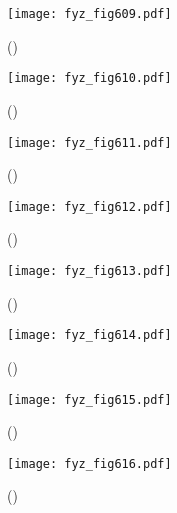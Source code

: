     \begin{figure}[ht!] %
      \centering
      \texttt{[image: fyz\_fig609.pdf]}
      \caption{
               (\cite[s.~707]{Feynman02})}
      \label{fyz:fig609}
    \end{figure}

    \begin{figure}[ht!] %
      \centering
      \texttt{[image: fyz\_fig610.pdf]}
      \caption{
               (\cite[s.~707]{Feynman02})}
      \label{fyz:fig610}
    \end{figure}

    \begin{figure}[ht!] %
      \centering
      \texttt{[image: fyz\_fig611.pdf]}
      \caption{
               (\cite[s.~707]{Feynman02})}
      \label{fyz:fig611}
    \end{figure}

    \begin{figure}[ht!] %
      \centering
      \texttt{[image: fyz\_fig612.pdf]}
      \caption{
               (\cite[s.~707]{Feynman02})}
      \label{fyz:fig612}
    \end{figure}

    \begin{figure}[ht!] %
      \centering
      \texttt{[image: fyz\_fig613.pdf]}
      \caption{
               (\cite[s.~707]{Feynman02})}
      \label{fyz:fig613}
    \end{figure}

    \begin{figure}[ht!] %
      \centering
      \texttt{[image: fyz\_fig614.pdf]}
      \caption{
               (\cite[s.~707]{Feynman02})}
      \label{fyz:fig614}
    \end{figure}

    \begin{figure}[ht!] %
      \centering
      \texttt{[image: fyz\_fig615.pdf]}
      \caption{
               (\cite[s.~707]{Feynman02})}
      \label{fyz:fig615}
    \end{figure}

    \begin{figure}[ht!] %
      \centering
      \texttt{[image: fyz\_fig616.pdf]}
      \caption{
               (\cite[s.~707]{Feynman02})}
      \label{fyz:fig616}
    \end{figure}

